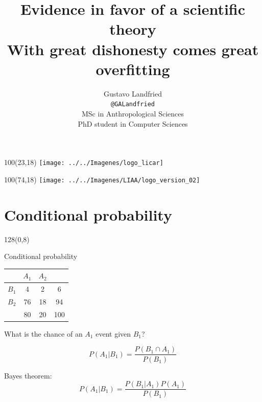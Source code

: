 \documentclass[shownotes]{beamer}
\title[Bayesian inference]{Evidence in favor of a scientific theory\\ \large With great dishonesty comes great overfitting}
\author[Gustavo Landfried]{Gustavo Landfried \\ \scriptsize \texttt{@GALandfried} \\\vspace{0.2cm}
MSc in Anthropological Sciences \\
PhD student in Computer Sciences 
\vspace{-0.3cm}}
\institute[DC-ICC-CONICET]{\texttt{[image: ../../Imagenes/dc-logo]}}
\date{}
\begin{document}
\begin{frame}[noframenumbering]
 
 \begin{textblock}{100}(23,18)
 \texttt{[image: ../../Imagenes/logo\_licar]} 
 \end{textblock}
  \begin{textblock}{100}(74,18)
 \texttt{[image: ../../Imagenes/LIAA/logo\_version\_02]} 
 \end{textblock}

\vspace{2.5cm}
\maketitle
 
\end{frame}

\footnotesize

\section{Conditional probability}


\begin{frame}
\begin{textblock}{128}(0,8)
\begin{center}
 \Large Conditional probability
\end{center}
\end{textblock}
\vspace{0.75cm}


\begin{table}[H]
\begin{tabular}{c|c|c|c}
 & $A_1$ & $A_2$ &  \\ \hline
 $B_1$& 4 & 2 & 6 \\ \hline
 $B_2$& 76 & 18 & 94\\ \hline
 & 80 & 20 & 100
\end{tabular}
\end{table}

\begin{center}
What is the chance of an $A_1$ event given $B_1$? 
\end{center}

\pause

\begin{equation*}
 P(A_1|B_1) = \frac{P(B_1 \cap A_1)}{P(B_1)}
\end{equation*}

\pause 

\begin{mdframed}
Bayes theorem:
\begin{equation}
  P(A_1|B_1) = \frac{P(B_1|A_1)P(A_1)}{P(B_1)}
\end{equation}
\end{mdframed}

\end{frame}
\end{document}
